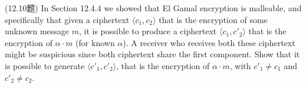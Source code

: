 \begin{questions}
        \begin{solution}
        \end{solution}

    \question (12.10题) In Section 12.4.4 we showed that El Gamal encryption is malleable, and specifically that given a ciphertext $\langle{c_1,c_2}\rangle$ that is the encryption of some unknown message $m$, it is possible to produce a ciphertext $\langle{c_1,c'_2}\rangle$ that is the encryption of $\alpha\cdot{m}$ (for known $\alpha$). A receiver who receives both these ciphertext might be suspicious since both ciphertext share the first component. Show that it is possible to generate $\langle{c'_1,c'_2}\rangle$, that is the encryption of $\alpha\cdot{m}$, with $c'_1\neq{c_1}$ and $c'_2\neq{c_2}$.

        \begin{solution}
        \end{solution}

\end{questions}



